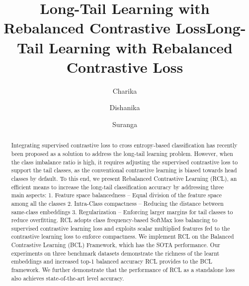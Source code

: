 \title{Long-Tail Learning with Rebalanced Contrastive Loss}



\begin{frontmatter}

\setcounter{page}{1}

\title{Long-Tail Learning with Rebalanced Contrastive Loss}

\author[1]{Charika } 
\author[1]{Dishanika }
\author[1]{Suranga }


\begin{abstract}
Integrating supervised contrastive loss to cross entropy-based classification has recently been proposed as a solution to address the long-tail learning problem. However, when the class imbalance ratio
 is high, it requires adjusting the supervised contrastive loss to support the tail classes, as the conventional contrastive learning is biased towards head classes by default. To this end, we present Rebalanced Contrastive Learning (RCL), an efficient means to increase the long-tail classification accuracy by addressing three main aspects: 1. Feature space balancedness -- Equal division of the feature space among all the classes 2. Intra-Class compactness -- Reducing the distance between same-class embeddings 3. Regularization -- Enforcing larger margins for tail classes to reduce overfitting. RCL adopts class frequency-based SoftMax loss balancing to supervised contrastive learning loss and exploits scalar multiplied features fed to the contrastive learning loss to enforce compactness. We implement RCL on the Balanced Contrastive Learning (BCL) Framework, which has the SOTA performance. Our experiments on three benchmark datasets demonstrate the richness of the learnt embeddings and increased top-1 balanced accuracy RCL provides to the BCL framework. We further demonstrate that the performance of RCL as a standalone loss also achieves state-of-the-art level accuracy. 
\end{abstract}

\end{frontmatter}

